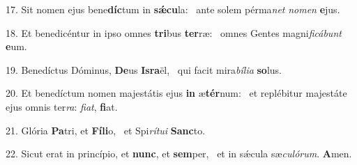 17. Sit nomen ejus bene\textbf{díc}tum in \textbf{sǽ}\textbf{cu}la: \ast\  ante solem pérma\textit{net} \textit{no}\textit{men} \textbf{e}jus.\

18. Et benedicéntur in ipso omnes \textbf{tri}bus \textbf{ter}ræ: \ast\  omnes Gentes magni\textit{fi}\textit{cá}\textit{bunt} \textbf{e}um.\

19. Benedíctus Dóminus, \textbf{De}us \textbf{Is}\textbf{ra}ël, \ast\  qui facit mira\textit{bí}\textit{li}\textit{a} \textbf{so}lus.\

20. Et benedíctum nomen majestátis ejus \textbf{in} æ\textbf{tér}num: \ast\  et replébitur majestáte ejus omnis ter\textit{ra}: \textit{fi}\textit{at}, \textbf{fi}at.\

21. Glória \textbf{Pa}tri, et \textbf{Fí}\textbf{li}o, \ast\  et Spi\textit{rí}\textit{tu}\textit{i} \textbf{Sanc}to.\

22. Sicut erat in princípio, et \textbf{nunc}, et \textbf{sem}per, \ast\  et in sǽcula sæ\textit{cu}\textit{ló}\textit{rum}. \textbf{A}men.\

